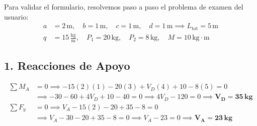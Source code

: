 \documentclass[10pt,a4paper]{article}
\begin{document}
Para validar el formulario, resolvemos paso a paso el problema de examen del usuario:
\begin{align*}
    a &= 2\,\text{m}, \quad b = 1\,\text{m}, \quad c = 1\,\text{m}, \quad d = 1\,\text{m} \implies L_{\text{tot}} = 5\,\text{m} \\
    q &= 15\,\frac{\text{kg}}{\text{m}}, \quad P_1 = 20\,\text{kg}, \quad P_2 = 8\,\text{kg}, \quad M = 10\,\text{kg}\cdot\text{m}
\end{align*}

\subsection{1. Reacciones de Apoyo}
\begin{align*}
    \sum M_A &= 0 \implies -15(2)(1) - 20(3) + V_D(4) + 10 - 8(5) = 0 \\
             &\implies -30 - 60 + 4 V_D + 10 - 40 = 0 \implies 4 V_D - 120 = 0 \implies \mathbf{V_D = 35\,\text{kg}} \\[4pt]
    \sum F_y &= 0 \implies V_A - 15(2) - 20 + 35 - 8 = 0 \\
             &\implies V_A - 30 - 20 + 35 - 8 = 0 \implies V_A - 23 = 0 \implies \mathbf{V_A = 23\,\text{kg}}
\end{align*}
\end{document}
